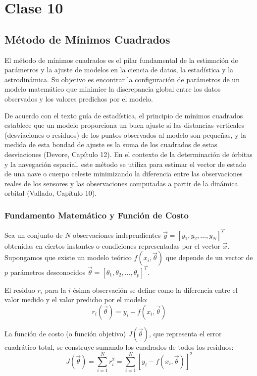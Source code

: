 \chapter{Clase 10}

\section{Método de Mínimos Cuadrados}

El método de mínimos cuadrados es el pilar fundamental de la estimación de parámetros y la ajuste de modelos en la ciencia de datos, la estadística y la astrodinámica. Su objetivo es encontrar la configuración de parámetros de un modelo matemático que minimice la discrepancia global entre los datos observados y los valores predichos por el modelo. 

De acuerdo con el texto guía de estadística, el principio de mínimos cuadrados establece que un modelo proporciona un buen ajuste si las distancias verticales (desviaciones o residuos) de los puntos observados al modelo son pequeñas, y la medida de esta bondad de ajuste es la suma de los cuadrados de estas desviaciones (Devore, Capítulo 12). En el contexto de la determinación de órbitas y la navegación espacial, este método se utiliza para estimar el vector de estado de una nave o cuerpo celeste minimizando la diferencia entre las observaciones reales de los sensores y las observaciones computadas a partir de la dinámica orbital (Vallado, Capítulo 10).

\subsection{Fundamento Matemático y Función de Costo}

Sea un conjunto de $N$ observaciones independientes $\vec{y} = [y_1, y_2, \dots, y_N]^T$ obtenidas en ciertos instantes o condiciones representadas por el vector $\vec{x}$. Supongamos que existe un modelo teórico $f(x_i, \vec{\theta})$ que depende de un vector de $p$ parámetros desconocidos $\vec{\theta} = [\theta_1, \theta_2, \dots, \theta_p]^T$.

El residuo $r_i$ para la $i$-ésima observación se define como la diferencia entre el valor medido y el valor predicho por el modelo:
$$ r_i(\vec{\theta}) = y_i - f(x_i, \vec{\theta}) $$

La función de costo (o función objetivo) $J(\vec{\theta})$, que representa el error cuadrático total, se construye sumando los cuadrados de todos los residuos:
$$ J(\vec{\theta}) = \sum_{i=1}^{N} r_i^2 = \sum_{i=1}^{N} [y_i - f(x_i, \vec{\theta})]^2 $$

